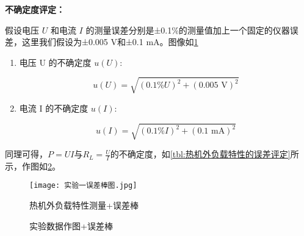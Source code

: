 \documentclass[dvipsnames, svgnames,a4paper,11pt]{article}
\begin{document}
        \textbf{不确定度评定：}
        
            
            假设电压 \( U \) 和电流 \( I \) 的测量误差分别是±0.1\%的测量值加上一个固定的仪器误差，这里我们假设为±0.005 V和±0.1 mA。图像如\cref{fig:实验一误差棒图}

            \begin{enumerate}
                 \item 电压 U 的不确定度 \( u(U) \):
                        
                    \[ u(U) = \sqrt{ ( 0.1\% U)^2 + (0.005 \text{ V})^2} \]
                    
                    \item 电流 I 的不确定度 \( u(I) \):
                    
                    \[ u(I) = \sqrt{ ( 0.1\% I)^2 + (0.1 \text{ mA})^2} \]
                    
            \end{enumerate}

            同理可得，$P=UI$与$R_L=\frac{U}{I}$的不确定度，如\cref{tbl:热机外负载特性的误差评定}所示，作图如\cref{fig:实验数据作图+误差棒1}。
                

                
                
                

                \begin{figure}[htbp]
                    \centering
                    \texttt{[image: 实验一误差棒图.jpg]}
                    \caption{热机外负载特性测量+误差棒}
                    \label{fig:实验一误差棒图}
                \end{figure}


                \begin{figure}[htbp]
                    \centering
                    \caption{实验数据作图+误差棒}
                    \label{fig:实验数据作图+误差棒1}
                \end{figure}
\end{document}
